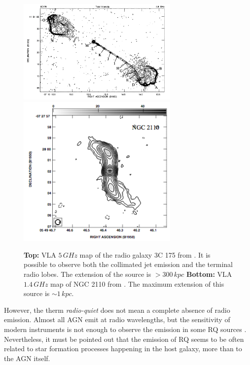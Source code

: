 \documentclass[../main.tex]{subfiles}
\begin{document}
\begin{figure}
\centering
\includegraphics[width=0.7\textwidth]{images/3c175.png} \\
\includegraphics[width=0.7\textwidth]{images/NGC2110.png}
\caption[]{\textbf{Top:} VLA $5\,\si{GHz}$ map of the radio galaxy 3C 175 from \citet{Bridle94}. It is possible to observe both the collimated jet emission and the terminal radio lobes. The extension of the source is $> 300\,\si{kpc}$ \textbf{Bottom:} VLA $1.4\,\si{GHz}$ map of NGC 2110 from \citet{Mundell09}. The maximum extension of this source is $\sim 1\,\si{kpc}$. }
\label{fig:radio_galaxies}
\end{figure}

However, the therm \emph{radio-quiet} does not mean a complete absence of radio emission.
Almost all AGN emit at radio wavelengths, but the sensitivity of modern instruments is not enough to observe the emission in some RQ sources \citep{Kellermann16}.
Nevertheless, it must be pointed out that the emission of RQ seems to be often related to star formation processes happening in the host galaxy, more than to the AGN itself.
\end{document}
